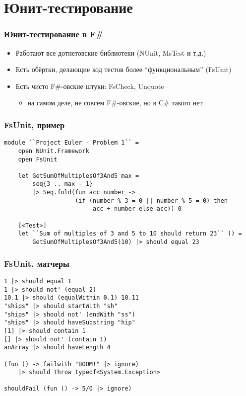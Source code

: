 \documentclass[xetex,mathserif,serif]{beamer}
\begin{document}
	\section{Юнит-тестирование}

	\begin{frame}
		\frametitle{Юнит-тестирование в F\#}
		\begin{itemize}
			\item Работают все дотнетовские библиотеки (NUnit, MsTest и т.д.)
			\item Есть обёртки, делающие код тестов более ``функциональным'' (FsUnit)
			\item Есть чисто F\#-овские штуки: FsCheck, Unquote 
			\begin{itemize}
				\item на самом деле, не совсем F\#-овские, но в C\# такого нет
			\end{itemize}
		\end{itemize}
	\end{frame}

	\begin{frame}[fragile]
		\frametitle{FsUnit, пример}
		\begin{verbatim}
module ``Project Euler - Problem 1`` =
    open NUnit.Framework
    open FsUnit

    let GetSumOfMultiplesOf3And5 max =
        seq{3 .. max - 1} 
        |> Seq.fold(fun acc number ->
                    (if (number % 3 = 0 || number % 5 = 0) then
                         acc + number else acc)) 0

    [<Test>]
    let ``Sum of multiples of 3 and 5 to 10 should return 23`` () =
        GetSumOfMultiplesOf3And5(10) |> should equal 23
		\end{verbatim}
\end{frame}

	\begin{frame}[fragile]
		\frametitle{FsUnit, матчеры}
		\begin{verbatim}
1 |> should equal 1
1 |> should not' (equal 2)
10.1 |> should (equalWithin 0.1) 10.11
"ships" |> should startWith "sh"
"ships" |> should not' (endWith "ss")
"ships" |> should haveSubstring "hip"
[1] |> should contain 1
[] |> should not' (contain 1)
anArray |> should haveLength 4

(fun () -> failwith "BOOM!" |> ignore) 
    |> should throw typeof<System.Exception>

shouldFail (fun () -> 5/0 |> ignore)
		\end{verbatim}
\end{frame}
\end{document}
